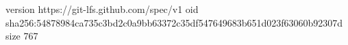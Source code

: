 version https://git-lfs.github.com/spec/v1
oid sha256:54878984ca735c3bd2c0a9bb63372c35df547649683b651d023f63060b92307d
size 767
